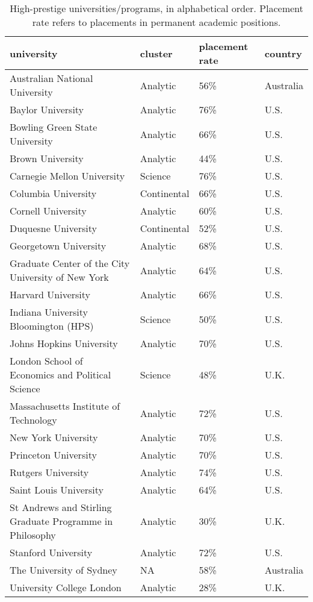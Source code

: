 
\begin{longtable}[t]{llll}
\caption{\label{tab:high.prestige}High-prestige universities/programs, in alphabetical order.  Placement rate refers to placements in permanent academic positions.}\\
\toprule
university & cluster & placement rate & country\\
\midrule
Australian National University & Analytic & 56\% & Australia\\
Baylor University & Analytic & 76\% & U.S.\\
Bowling Green State University & Analytic & 66\% & U.S.\\
Brown University & Analytic & 44\% & U.S.\\
Carnegie Mellon University & Science & 76\% & U.S.\\
\addlinespace
Columbia University & Continental & 66\% & U.S.\\
Cornell University & Analytic & 60\% & U.S.\\
Duquesne University & Continental & 52\% & U.S.\\
Georgetown University & Analytic & 68\% & U.S.\\
Graduate Center of the City University of New York & Analytic & 64\% & U.S.\\
\addlinespace
Harvard University & Analytic & 66\% & U.S.\\
Indiana University Bloomington (HPS) & Science & 50\% & U.S.\\
Johns Hopkins University & Analytic & 70\% & U.S.\\
London School of Economics and Political Science & Science & 48\% & U.K.\\
Massachusetts Institute of Technology & Analytic & 72\% & U.S.\\
\addlinespace
New York University & Analytic & 70\% & U.S.\\
Princeton University & Analytic & 70\% & U.S.\\
Rutgers University & Analytic & 74\% & U.S.\\
Saint Louis University & Analytic & 64\% & U.S.\\
St Andrews and Stirling Graduate Programme in Philosophy & Analytic & 30\% & U.K.\\
\addlinespace
Stanford University & Analytic & 72\% & U.S.\\
The University of Sydney & NA & 58\% & Australia\\
University College London & Analytic & 28\% & U.K.\\

\end{longtable}
